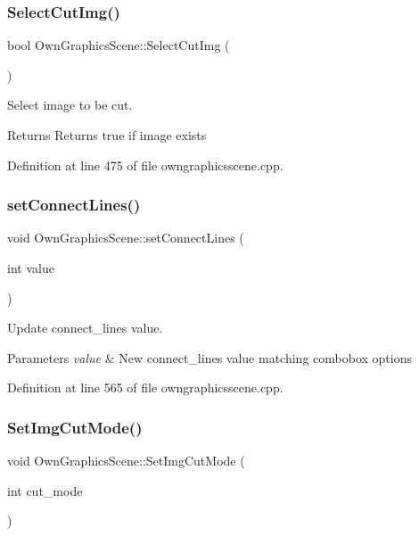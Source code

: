 \subsubsection{\texorpdfstring{Select\+Cut\+Img()}{SelectCutImg()}}
{\footnotesize\ttfamily bool Own\+Graphics\+Scene\+::\+Select\+Cut\+Img (\begin{DoxyParamCaption}{ }\end{DoxyParamCaption})}



Select image to be cut. 

\begin{DoxyReturn}{Returns}
Returns true if image exists 
\end{DoxyReturn}


Definition at line 475 of file owngraphicsscene.\+cpp.

\mbox{\label{classOwnGraphicsScene_ad62254e1884fa4817ff1beaa3bc6c011}} 
\subsubsection{\texorpdfstring{set\+Connect\+Lines()}{setConnectLines()}}
{\footnotesize\ttfamily void Own\+Graphics\+Scene\+::set\+Connect\+Lines (\begin{DoxyParamCaption}\item[{int}]{value }\end{DoxyParamCaption})}



Update connect\+\_\+lines value. 


\begin{DoxyParams}{Parameters}
{\em value} & New connect\+\_\+lines value matching combobox options \\
\hline
\end{DoxyParams}


Definition at line 565 of file owngraphicsscene.\+cpp.

\mbox{\label{classOwnGraphicsScene_a656919c9fdd0827ae182d3d3f5f91e4f}} 
\subsubsection{\texorpdfstring{Set\+Img\+Cut\+Mode()}{SetImgCutMode()}}
{\footnotesize\ttfamily void Own\+Graphics\+Scene\+::\+Set\+Img\+Cut\+Mode (\begin{DoxyParamCaption}\item[{int}]{cut\+\_\+mode }\end{DoxyParamCaption})}



